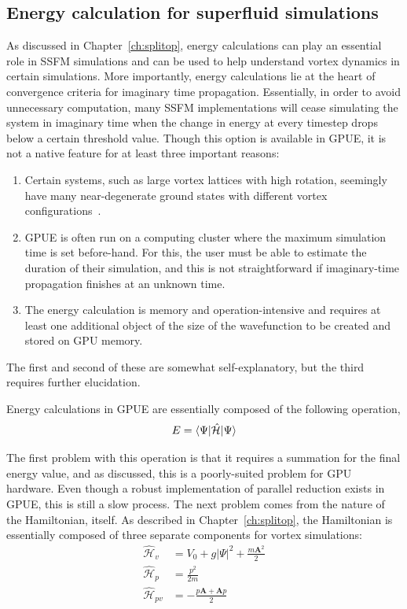 \subsection{Energy calculation for superfluid simulations}

As discussed in Chapter~\ref{ch:splitop}, energy calculations can play an essential role in SSFM simulations and can be used to help understand vortex dynamics in certain simulations.
More importantly, energy calculations lie at the heart of convergence criteria for imaginary time propagation.
Essentially, in order to avoid unnecessary computation, many SSFM implementations will cease simulating the system in imaginary time when the change in energy at every timestep drops below a certain threshold value.
Though this option is available in GPUE, it is not a native feature for at least three important reasons:

\begin{enumerate}
\item Certain systems, such as large vortex lattices with high rotation, seemingly have many near-degenerate ground states with different vortex configurations~\cite{o2017, o2016, o2016topo}.
\item GPUE is often run on a computing cluster where the maximum simulation time is set before-hand.
For this, the user must be able to estimate the duration of their simulation, and this is not straightforward if imaginary-time propagation finishes at an unknown time.
\item The energy calculation is memory and operation-intensive and requires at least one additional object of the size of the wavefunction to be created and stored on GPU memory.
\end{enumerate}

\noindent The first and second of these are somewhat self-explanatory, but the third requires further elucidation.

Energy calculations in GPUE are essentially composed of the following operation,
\begin{equation}
E = \braket{\Psi|\mathcal{\hat H}|\Psi}
\end{equation}

\noindent The first problem with this operation is that it requires a summation for the final energy value, and as discussed, this is a poorly-suited problem for GPU hardware.
Even though a robust implementation of parallel reduction exists in GPUE, this is still a slow process.
The next problem comes from the nature of the Hamiltonian, itself.
As described in Chapter~\ref{ch:splitop}, the Hamiltonian is essentially composed of three separate components for vortex simulations:
\begin{align}
\mathcal{\hat H}_v &= V_0 + g|\Psi|^2 + \frac{m\mathbf{A}^2}{2} \\
\mathcal{\hat H}_p &= \frac{p^2}{2m} \\
\mathcal{\hat H}_{pv} &= -\frac{p\mathbf{A} + \mathbf{A}p}{2}
\end{align}

